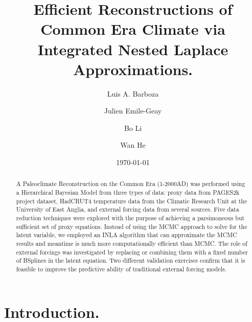 \documentclass[12pt]{amsart}
\theoremstyle{plain}
\theoremstyle{definition}
\theoremstyle{remark}
\begin{document}
\doublespacing
\title[]{Efficient Reconstructions of Common Era Climate via Integrated Nested Laplace Approximations.}

\author[]{Luis A. Barboza}
\address{Centro de Investigacion en Matematica Pura y Aplicada (CIMPA)-Escuela
  de Matematica, Universidad de Costa Rica\\
San Jos\'e, Costa Rica}


\author[]{Julien Emile-Geay}
\address{Department of Earth Sciences \\
  University of Southern California \\
  Los Angeles, California, USA.
}


\author[]{Bo Li}
\address{Department of Statistics \\
  University of Illinois at Urbana-Champaign \\
  Champaign, Illinois, USA.
}

\author[]{Wan He}

\date{\today}
\subjclass[2010]{}
\maketitle

\begin{abstract}
A Paleoclimate Reconstruction on the Common Era (1-2000AD) was performed using a
Hierarchical Bayesian Model from three types of data: proxy data from PAGES2k
project dataset, HadCRUT4 temperature data from the Climatic Research Unit
at the University of East Anglia, and external forcing data from several sources.
Five data reduction techniques were explored with the purpose of achieving a parsimoneous but sufficient set of
proxy equations. Instead of using the MCMC approach to solve for the latent variable, we employed an
INLA algorithm that can approximate the MCMC results and meantime is  much more computationally efficient than MCMC. The role
of external forcings was investigated by replacing or combining them with a fixed number of
BSplines in the latent equation. Two different validation exercises confirm that
it is feasible to improve the predictive ability of traditional external forcing models. 
\end{abstract}

\section{Introduction.}
\label{sec:intro}
\end{document}
